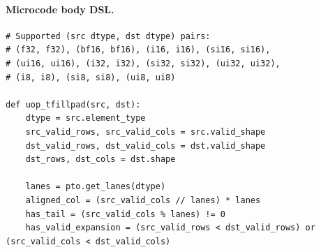 \paragraph{Microcode body DSL.}
\begin{lstlisting}[style=ptocode]
# Supported (src dtype, dst dtype) pairs:
# (f32, f32), (bf16, bf16), (i16, i16), (si16, si16),
# (ui16, ui16), (i32, i32), (si32, si32), (ui32, ui32),
# (i8, i8), (si8, si8), (ui8, ui8)

def uop_tfillpad(src, dst):
    dtype = src.element_type
    src_valid_rows, src_valid_cols = src.valid_shape
    dst_valid_rows, dst_valid_cols = dst.valid_shape
    dst_rows, dst_cols = dst.shape

    lanes = pto.get_lanes(dtype)
    aligned_col = (src_valid_cols // lanes) * lanes
    has_tail = (src_valid_cols % lanes) != 0
    has_valid_expansion = (src_valid_rows < dst_valid_rows) or (src_valid_cols < dst_valid_cols)


\end{lstlisting}
